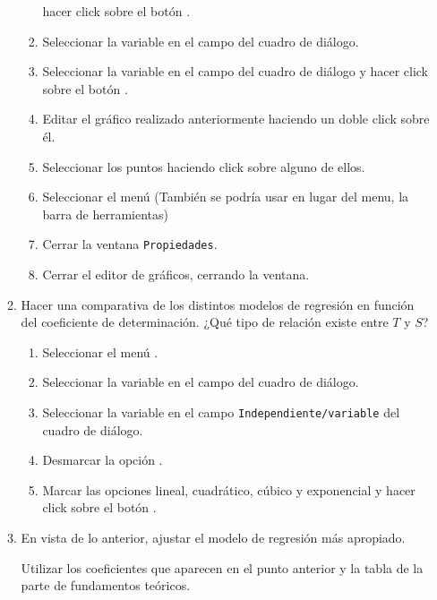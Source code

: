 \begin{enumerate}[leftmargin=*]
\begin{enumerate}
\begin{indicacion}
\begin{enumerate}
hacer click sobre el botón .
\item Seleccionar la variable  en el campo  
del cuadro de diálogo. 
\item Seleccionar la variable  en el campo  
del cuadro de diálogo y hacer click sobre el botón .
\item Editar el gráfico realizado anteriormente haciendo un doble 
click sobre él.
\item Seleccionar los puntos haciendo click sobre alguno de ellos.
\item Seleccionar el menú  
(También se podría usar en lugar del menu, la barra de herramientas) 
\item Cerrar la ventana \texttt{Propiedades}.
\item Cerrar el editor de gráficos, cerrando la ventana.
\end{enumerate}
\end{indicacion}

\item Hacer una comparativa de los distintos modelos de regresión en 
función del coeficiente de determinación. ¿Qué
tipo de relación existe entre $T$ y $S$?
\begin{indicacion}
\begin{enumerate}
\item Seleccionar el menú .
\item Seleccionar la variable  en el campo  
del cuadro de diálogo.
\item Seleccionar la variable  en el campo 
\texttt{Independiente/variable} del cuadro de diálogo.
\item Desmarcar la opción .
\item Marcar las opciones lineal, cuadrático, cúbico y exponencial y hacer click sobre el botón .
\end{enumerate}
\end{indicacion}

\item En vista de lo anterior, ajustar el modelo de regresión más apropiado.
\begin{indicacion}
Utilizar los coeficientes que aparecen en el punto anterior y la tabla 
de la parte de fundamentos teóricos.
\end{indicacion}
\end{enumerate}

\end{enumerate}



